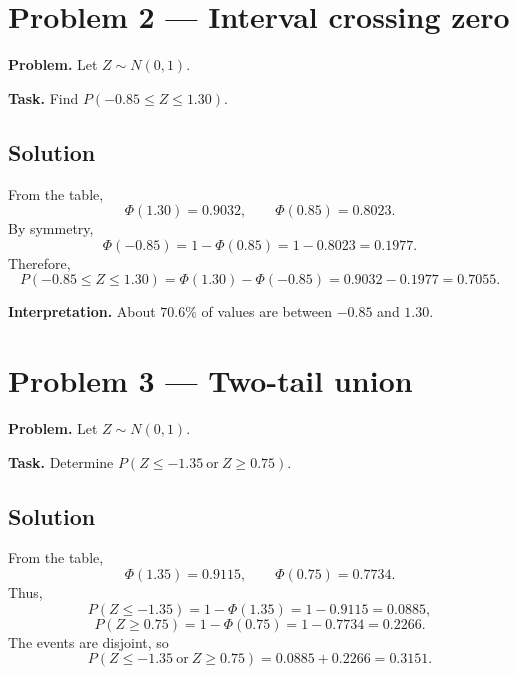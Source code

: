 \section{Problem 2 --- Interval crossing zero}
\textbf{Problem.}
Let \(Z\sim N(0,1)\).

\textbf{Task.}
Find \(P(-0.85\le Z\le 1.30)\).

\subsection*{Solution}
From the table,
\[
\Phi(1.30)=0.9032,
\qquad
\Phi(0.85)=0.8023.
\]
By symmetry,
\[
\Phi(-0.85)=1-\Phi(0.85)=1-0.8023=0.1977.
\]
Therefore,
\[
P(-0.85\le Z\le 1.30)=\Phi(1.30)-\Phi(-0.85)=0.9032-0.1977=0.7055.
\]

\begin{center}
\end{center}

\textbf{Interpretation.} About \(70.6\%\) of values are between \(-0.85\) and \(1.30\).

\section{Problem 3 --- Two-tail union}
\textbf{Problem.}
Let \(Z\sim N(0,1)\).

\textbf{Task.}
Determine \(P(Z\le -1.35\ \text{or}\ Z\ge 0.75)\).

\subsection*{Solution}
From the table,
\[
\Phi(1.35)=0.9115,
\qquad
\Phi(0.75)=0.7734.
\]
Thus,
\[
P(Z\le -1.35)=1-\Phi(1.35)=1-0.9115=0.0885,
\]
\[
P(Z\ge 0.75)=1-\Phi(0.75)=1-0.7734=0.2266.
\]
The events are disjoint, so
\[
P(Z\le -1.35\ \text{or}\ Z\ge 0.75)=0.0885+0.2266=0.3151.
\]

